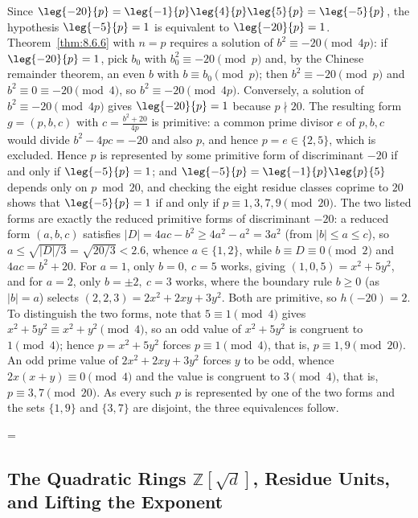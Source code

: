 \documentclass[11pt]{article}
\makeatletter
\theoremstyle{ntstyle}
\let\nt@closedisplay\]
\def\nt@guardedclose{\@ifnextchar\par{\nt@closeafterpar}{\@ifnextchar\end{\postdisplaypenalty\@M\nt@closedisplay}{\nt@closedisplay}}}
\def\nt@closeafterpar\par{\@ifnextchar\par{\nt@closeafterpar}{\@ifnextchar\end{\postdisplaypenalty\@M\nt@closedisplay\par}{\nt@closedisplay\par}}}
\renewenvironment{proof}[1][\proofname]{\par
  \pushQED{\qed}\normalfont\topsep\medskipamount\edef\nt@afterproof{\@endparpenalty=\the\@endparpenalty\relax}\@beginparpenalty\@M\@endparpenalty\@M\let\]\nt@guardedclose\trivlist\item[]\textit{#1\@addpunct{.}} \ignorespaces}{\ifvmode\addpenalty\@M\fi\popQED\nt@afterproof\endtrivlist\@endpefalse}
\makeatother
\begin{document}
\begin{proof} Since $\leg{-20}{p} =
		\leg{-1}{p}\leg{4}{p}\leg{5}{p}
		= \leg{-5}{p}$, the hypothesis $\leg{-5}{p} = 1$ is equivalent to
	$\leg{-20}{p} = 1$. Theorem~\ref{thm:8.6.6} with $n = p$ requires a solution of
	$b^{2} \equiv -20 \pmod{4p}$: if $\leg{-20}{p} = 1$, pick $b_0$ with
	$b_0^{2} \equiv -20 \pmod{p}$ and, by the Chinese remainder theorem,
	an even $b$ with $b \equiv b_0 \pmod{p}$; then $b^{2} \equiv -20
		\pmod{p}$ and $b^{2} \equiv 0 \equiv -20 \pmod{4}$, so $b^{2} \equiv
		-20 \pmod{4p}$. Conversely, a solution of $b^{2} \equiv -20 \pmod{4p}$
	gives $\leg{-20}{p} = 1$ because $p \nmid 20$. The resulting form
	$g = (p, b, c)$ with $c = \tfrac{b^{2}+20}{4p}$ is primitive: a common
	prime divisor $e$ of $p, b, c$ would divide $b^{2} - 4pc = -20$ and
	also $p$, and hence $p = e \in \{2, 5\}$, which is excluded. Hence $p$ is
	represented by some primitive form of discriminant $-20$ if and only if
	$\leg{-5}{p} = 1$; and $\leg{-5}{p} =
		\leg{-1}{p}\leg{p}{5}$ depends only on
	$p \bmod 20$, and checking the eight residue classes coprime to $20$ shows that
	$\leg{-5}{p} = 1$ if and only if $p \equiv 1, 3, 7, 9 \pmod{20}$.
	The two listed forms are exactly the reduced primitive forms of
	discriminant $-20$: a reduced form $(a,b,c)$ satisfies $|D| = 4ac - b^2 \ge 4a^2 - a^2 = 3a^2$ (from $|b| \le a \le c$), so $a \le
		\sqrt{|D|/3} = \sqrt{20/3} < 2.6$, whence $a \in \{1,
		2\}$, while $b \equiv D \equiv 0 \pmod{2}$ and $4ac = b^{2} + 20$. For
	$a = 1$, only $b = 0,\ c = 5$ works, giving $(1, 0, 5) = x^{2} +
		5y^{2}$, and for $a = 2$, only $b = \pm 2,\ c = 3$ works, where the
	boundary rule $b \ge 0$ (as $|b| = a$) selects $(2, 2, 3) = 2x^{2} +
		2xy + 3y^{2}$. Both are primitive, so $h(-20) = 2$.
	To distinguish the two forms, note that $5 \equiv 1 \pmod{4}$ gives $x^{2} + 5y^{2}
		\equiv x^{2} + y^{2} \pmod{4}$, so an odd value of $x^{2} + 5y^{2}$ is
	congruent to $1 \pmod{4}$; hence $p = x^{2} + 5y^{2}$ forces $p \equiv 1
		\pmod{4}$, that is, $p \equiv 1, 9 \pmod{20}$. An odd prime value of
	$2x^{2} + 2xy + 3y^{2}$ forces $y$ to be odd, whence $2x(x + y) \equiv 0
		\pmod{4}$ and the value is congruent to $3 \pmod{4}$, that is, $p \equiv 3, 7
		\pmod{20}$. As every such $p$ is represented by one of the two forms
	and the sets $\{1, 9\}$ and $\{3, 7\}$ are disjoint, the three equivalences
	follow.

\end{proof}
\subsection{The Quadratic Rings \texorpdfstring{$\mathbb{Z}[\sqrt{d}]$}{Z[sqrt d]}, Residue Units, and Lifting the Exponent}\label{subsec:8.7}
\end{document}
